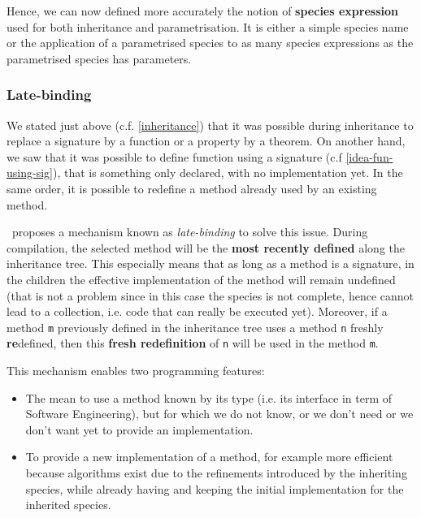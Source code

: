 Hence, we can now defined more accurately the notion of {\bf species
expression} used for both inheritance and parametrisation. It is either
a simple species name or the application of a parametrised species to
as many species expressions as the parametrised species has
parameters.


\subsubsection{Late-binding}
\label{late-binding}
We stated just above (c.f. \ref{inheritance}) that it was possible
during inheritance to replace a signature by a function or a property
by a theorem. On another hand, we saw that it was possible to define
function using a signature (c.f \ref{idea-fun-using-sig}), that is
something only declared, with no implementation yet. In the same
order, it is possible to redefine a method already used by an existing
method.

\smallskip
\focal\ proposes a mechanism known as {\em late-binding} to solve this
issue. During compilation, the selected method will be the {\bf most
recently defined} along the inheritance tree. This especially means
that as long as a method is a signature, in the children the effective
implementation of the method will remain undefined (that is not a
problem since in this case the species is not complete, hence cannot
lead to a collection, i.e. code that can really be executed
yet). Moreover, if a method {\tt m} previously defined in the
inheritance tree uses a method {\tt n} freshly {\bf re}defined, then
this {\bf fresh redefinition} of {\tt n} will be used in the method
{\tt m}.

\smallskip
This mechanism enables two programming features:
\begin{itemize}
  \item The mean to use a method known by its type (i.e. its interface
    in term of Software Engineering), but for which we do not know, or
    we don't need or we don't want yet to provide an implementation.

  \item To provide a new implementation of a method, for example more
    efficient because algorithms exist due to the refinements
    introduced by the inheriting species, while already having and
    keeping the initial implementation for the inherited species.
\end{itemize}



